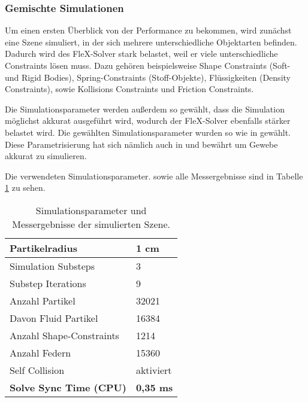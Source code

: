 \subsubsection{Gemischte Simulationen}

Um einen ersten Überblick von der Performance zu bekommen, wird zunächst eine Szene simuliert, in der sich mehrere unterschiedliche Objektarten befinden. Dadurch wird des FleX-Solver stark belastet, weil er viele unterschiedliche Constraints lösen muss. Dazu gehören beispielsweise Shape Constraints (Soft- und Rigid Bodies), Spring-Constraints (Stoff-Objekte), Flüssigkeiten (Density Constraints), sowie Kollisions Constraints und Friction Constraints.



Die Simulationsparameter werden außerdem so gewählt, dass die Simulation möglichst akkurat ausgeführt wird, wodurch der FleX-Solver ebenfalls stärker belastet wird. Die gewählten Simulationsparameter wurden so wie in \cite{BreastBiopsy} gewählt. Diese Parametrisierung hat sich nämlich auch in \cite{PBDKidney} und \cite{VRSim20} bewährt um Gewebe akkurat zu simulieren.

Die verwendeten Simulationsparameter. sowie alle Messergebnisse sind in Tabelle \ref{table_mixed_sim} zu sehen.

\begin{table}[hbt!]
\centering
\caption{Simulationsparameter und Messergebnisse der simulierten Szene.}
\label{table_mixed_sim}
\begin{tabular}{l|l}
 \hline
Partikelradius & 1 cm  \\ \hline
Simulation Substeps & 3      \\ \hline
Substep Iterations & 9            \\ \hline
Anzahl Partikel & 32021            \\ \hline
Davon Fluid Partikel & 16384	\\ \hline
Anzahl Shape-Constraints & 1214		\\ \hline
Anzahl Federn & 15360 		\\ \hline
Self Collision & aktiviert \\ \hline%
\textbf{Solve Sync Time (CPU)} & \textbf{0,35 ms}
\end{tabular}
\end{table}

